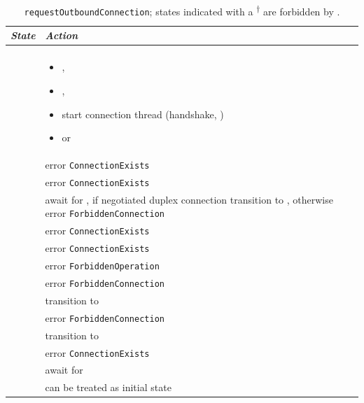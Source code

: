 \begin{table}
  \begin{tabular}[h]{ll}
    \textit{State}           & \textit{Action} \\\hline\\[2pt]
    \InitialState{}          &
      \begin{minipage}[t]{8cm}
        \begin{itemize}
          \item \ReservedOutboundState{},
          \item \Connected{},
          \item start connection thread (handshake, \mux{})
          \item \NegotiatedUniOut{} or \NegotiatedDupOut{}
        \end{itemize}
      \end{minipage}
      \vspace{8pt}\\
    \ReservedOutboundState{} & error \texttt{ConnectionExists} \\[8pt]
    \UnnegotiatedStateOut{}  & error \texttt{ConnectionExists} \\[8pt]
    \UnnegotiatedStateIn{  } &
      \begin{minipage}[t]{7cm}
        await for \InboundStateAny{}, if negotiated duplex connection
        transition to \DuplexState{}, otherwise error
        \texttt{ForbiddenConnection}
      \end{minipage}
      \vspace{8pt}\\
    \OutboundStateAny{}      & error \texttt{ConnectionExists}    \\[8pt]
    \OutboundStateDupTau{}   & error \texttt{ConnectionExists}    \\[8pt]
    \OutboundIdleStateAny{}  & error \texttt{ForbiddenOperation}  \\[8pt]
    \InboundIdleStateUni{}   & error \texttt{ForbiddenConnection} \\[8pt]
    \InboundIdleStateDup{}   & transition to \OutboundStateDup{}  \\[8pt]
    \InboundStateUni{}       & error \texttt{ForbiddenConnection} \\[8pt]
    \InboundStateDup{}       & transition to \DuplexState{}       \\[8pt]
    \DuplexState{}           & error \texttt{ConnectionExists}    \\[8pt]
    \TerminatingState{}      & await for \TerminatedState{}       \\[8pt]
    \TerminatedState{}       & can be treated as initial state    \\[8pt]
  \end{tabular}
  \caption{\texttt{requestOutboundConnection}; states indicated with a \textsuperscript{$\dagger$} are forbidden by \TCP{}.}
  \label{table:requestOutboundConnection}
\end{table}

